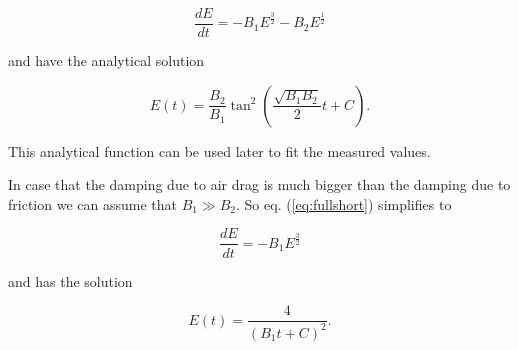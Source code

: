 \begin{equation} \label{eq:fullshort}
\frac{dE}{dt} = - B_1 E^\frac{3}{2}  - B_2 E^\frac{1}{2}
\end{equation}

and have the analytical solution

\begin{equation}
E(t) = \frac{B_2}{B_1}\tan^2\left(\frac{\sqrt{B_1 B_2}}{2}t+C\right).
\end{equation}

This analytical function can be used later to fit the measured values. 

In case that the damping due to air drag is much bigger than the damping due to friction we can assume that $B_1 \gg B_2$. So eq. (\ref{eq:fullshort}) simplifies to

\begin{equation}
\frac{dE}{dt} = - B_1 E^\frac{3}{2}
\end{equation}


and has the solution

\begin{equation}\label{eq:air}
E(t)=\frac{4}{\left(B_1 t + C\right)^2}.
\end{equation}

%
